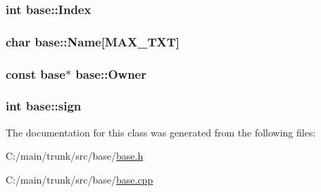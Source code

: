 \label{classbase_a350d087127f1d8ba8807eb521b6336fd}
\hypertarget{classbase_afa59aaa1a0201700640234eb13a03aae}{
\subsubsection[{Index}]{\setlength{\rightskip}{0pt plus 5cm}int {\bf base::Index}}}
\label{classbase_afa59aaa1a0201700640234eb13a03aae}
\hypertarget{classbase_abd8f99d007cb1914c0837488829974ec}{
\subsubsection[{Name}]{\setlength{\rightskip}{0pt plus 5cm}char {\bf base::Name}\mbox{[}MAX\_\-TXT\mbox{]}}}
\label{classbase_abd8f99d007cb1914c0837488829974ec}
\hypertarget{classbase_a907869971a8ad022d6292922b1ff3bb5}{
\subsubsection[{Owner}]{\setlength{\rightskip}{0pt plus 5cm}const {\bf base}$\ast$ {\bf base::Owner}}}
\label{classbase_a907869971a8ad022d6292922b1ff3bb5}
\hypertarget{classbase_aeccd588fec27112c3b58c91b7d6797da}{
\subsubsection[{sign}]{\setlength{\rightskip}{0pt plus 5cm}int {\bf base::sign}}}
\label{classbase_aeccd588fec27112c3b58c91b7d6797da}


The documentation for this class was generated from the following files:\begin{DoxyCompactItemize}
\item 
C:/main/trunk/src/base/\hyperlink{base_8h}{base.h}\item 
C:/main/trunk/src/base/\hyperlink{base_8cpp}{base.cpp}\end{DoxyCompactItemize}
